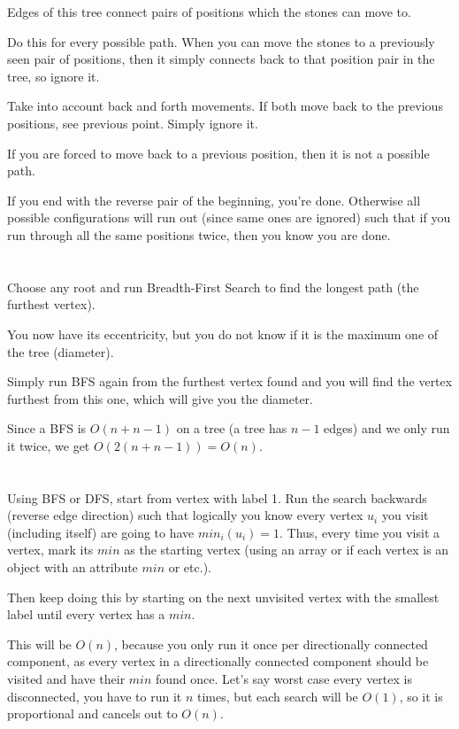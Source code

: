 \documentclass[11pt,letterpaper]{article}
\begin{document}
	Edges of this tree connect pairs of positions which the stones can move to.
	
	Do this for every possible path. When you can move the stones to a previously seen pair of positions, then it simply connects back to that position pair in the tree, so ignore it.
	
	Take into account back and forth movements. If both move back to the previous positions, see previous point. Simply ignore it.
	
	If you are forced to move back to a previous position, then it is not a possible path.
	
	If you end with the reverse pair of the beginning, you're done.
	Otherwise all possible configurations will run out (since same ones are ignored) such that if you run through all the same positions twice, then you know you are done.
	
	\section{}
	Choose any root and run Breadth-First Search to find the longest path (the furthest vertex).
	
	You now have its eccentricity, but you do not know if it is the maximum one of the tree (diameter).
	
	Simply run BFS again from the furthest vertex found and you will find the vertex furthest from this one, which will give you the diameter.
	
	Since a BFS is $O(n+n-1)$ on a tree (a tree has $n-1$ edges) and we only run it twice, we get $O(2(n+n-1))=O(n)$.
	
	\section{}
	Using BFS or DFS, start from vertex with label 1. Run the search backwards (reverse edge direction) such that logically you know every vertex $u_i$ you visit (including itself) are going to have $min_i(u_i)=1$. Thus, every time you visit a vertex, mark its $min$ as the starting vertex (using an array or if each vertex is an object with an attribute $min$ or etc.).
	
	Then keep doing this by starting on the next unvisited vertex with the smallest label until every vertex has a $min$.
	
	This will be $O(n)$, because you only run it once per directionally connected component, as every vertex in a directionally connected component should be visited and have their $min$ found once. Let's say worst case every vertex is disconnected, you have to run it $n$ times, but each search will be $O(1)$, so it is proportional and cancels out to $O(n)$.
	
\end{document}
